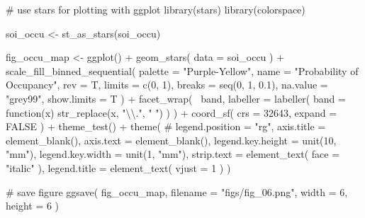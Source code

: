 \documentclass[
]{article}
\newenvironment{Shaded}{}{}
\newcommand{\CharTok}[1]{\textcolor[rgb]{0.00,0.50,0.50}{#1}}
\newcommand{\CommentTok}[1]{\textcolor[rgb]{0.00,0.50,0.00}{#1}}
\newcommand{\ControlFlowTok}[1]{\textcolor[rgb]{0.00,0.00,1.00}{#1}}
\newcommand{\DataTypeTok}[1]{#1}
\newcommand{\DecValTok}[1]{#1}
\newcommand{\FloatTok}[1]{#1}
\newcommand{\KeywordTok}[1]{\textcolor[rgb]{0.00,0.00,1.00}{#1}}
\newcommand{\NormalTok}[1]{#1}
\newcommand{\OperatorTok}[1]{#1}
\newcommand{\OtherTok}[1]{\textcolor[rgb]{1.00,0.25,0.00}{#1}}
\newcommand{\StringTok}[1]{\textcolor[rgb]{0.00,0.50,0.50}{#1}}
\begin{document}
\begin{Shaded}
\begin{Highlighting}[]
\CommentTok{# use stars for plotting with ggplot}
\KeywordTok{library}\NormalTok{(stars)}
\KeywordTok{library}\NormalTok{(colorspace)}

\NormalTok{soi_occu <-}\StringTok{ }\KeywordTok{st_as_stars}\NormalTok{(soi_occu)}

\NormalTok{fig_occu_map <-}\StringTok{ }\KeywordTok{ggplot}\NormalTok{() }\OperatorTok{+}
\StringTok{  }\KeywordTok{geom_stars}\NormalTok{(}
    \DataTypeTok{data =}\NormalTok{ soi_occu}
\NormalTok{  ) }\OperatorTok{+}
\StringTok{  }\KeywordTok{scale_fill_binned_sequential}\NormalTok{(}
    \DataTypeTok{palette =} \StringTok{"Purple-Yellow"}\NormalTok{,}
    \DataTypeTok{name =} \StringTok{"Probability of Occupancy"}\NormalTok{,}
    \DataTypeTok{rev =}\NormalTok{ T,}
    \DataTypeTok{limits =} \KeywordTok{c}\NormalTok{(}\DecValTok{0}\NormalTok{, }\DecValTok{1}\NormalTok{),}
    \DataTypeTok{breaks =} \KeywordTok{seq}\NormalTok{(}\DecValTok{0}\NormalTok{, }\DecValTok{1}\NormalTok{, }\FloatTok{0.1}\NormalTok{), }
    \DataTypeTok{na.value =} \StringTok{"grey99"}\NormalTok{,}
    \DataTypeTok{show.limits =}\NormalTok{ T}
\NormalTok{  ) }\OperatorTok{+}
\StringTok{  }\KeywordTok{facet_wrap}\NormalTok{(}
    \OperatorTok{~}\NormalTok{band,}
    \DataTypeTok{labeller =} \KeywordTok{labeller}\NormalTok{(}
      \DataTypeTok{band =} \ControlFlowTok{function}\NormalTok{(x) }\KeywordTok{str_replace}\NormalTok{(x, }\StringTok{"}\CharTok{\textbackslash{}\textbackslash{}}\StringTok{."}\NormalTok{, }\StringTok{" "}\NormalTok{)}
\NormalTok{    )}
\NormalTok{  ) }\OperatorTok{+}
\StringTok{  }\KeywordTok{coord_sf}\NormalTok{(}
    \DataTypeTok{crs =} \DecValTok{32643}\NormalTok{,}
    \DataTypeTok{expand =} \OtherTok{FALSE}
\NormalTok{  ) }\OperatorTok{+}
\StringTok{  }\KeywordTok{theme_test}\NormalTok{() }\OperatorTok{+}
\StringTok{  }\KeywordTok{theme}\NormalTok{(}
    \CommentTok{# legend.position = "rg",}
    \DataTypeTok{axis.title =} \KeywordTok{element_blank}\NormalTok{(),}
    \DataTypeTok{axis.text =} \KeywordTok{element_blank}\NormalTok{(),}
    \DataTypeTok{legend.key.height =} \KeywordTok{unit}\NormalTok{(}\DecValTok{10}\NormalTok{, }\StringTok{"mm"}\NormalTok{),}
    \DataTypeTok{legend.key.width =} \KeywordTok{unit}\NormalTok{(}\DecValTok{1}\NormalTok{, }\StringTok{"mm"}\NormalTok{),}
    \DataTypeTok{strip.text =} \KeywordTok{element_text}\NormalTok{(}
      \DataTypeTok{face =} \StringTok{"italic"}
\NormalTok{    ),}
    \DataTypeTok{legend.title =} \KeywordTok{element_text}\NormalTok{(}
      \DataTypeTok{vjust =} \DecValTok{1}
\NormalTok{    )}
\NormalTok{  )}

\CommentTok{# save figure}
\KeywordTok{ggsave}\NormalTok{(}
\NormalTok{  fig_occu_map,}
  \DataTypeTok{filename =} \StringTok{"figs/fig_06.png"}\NormalTok{,}
  \DataTypeTok{width =} \DecValTok{6}\NormalTok{, }\DataTypeTok{height =} \DecValTok{6}
\NormalTok{)}
\end{Highlighting}
\end{Shaded}
\end{document}
